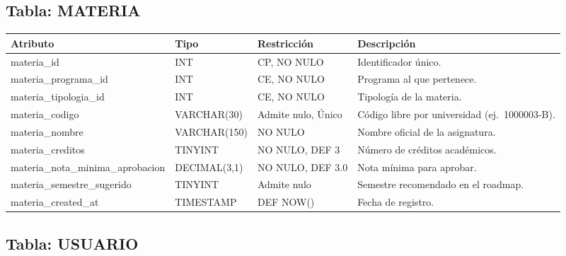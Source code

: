 \documentclass[12pt, letterpaper, twoside]{article}
\begin{document}
\subsection{Tabla: MATERIA}

\begin{center}
\begin{tabular}{p{4.2cm} p{2.8cm} p{2.8cm} p{3.8cm}}
\toprule
\textbf{Atributo} & \textbf{Tipo} & \textbf{Restricción} & \textbf{Descripción} \\
\midrule
materia\_id                       & INT          & CP, NO NULO          & Identificador único. \\
materia\_programa\_id             & INT          & CE, NO NULO          & Programa al que pertenece. \\
materia\_tipologia\_id            & INT          & CE, NO NULO          & Tipología de la materia. \\
materia\_codigo                   & VARCHAR(30)  & Admite nulo, Único   & Código libre por universidad (ej.\ 1000003-B). \\
materia\_nombre                   & VARCHAR(150) & NO NULO              & Nombre oficial de la asignatura. \\
materia\_creditos                 & TINYINT      & NO NULO, DEF 3       & Número de créditos académicos. \\
materia\_nota\_minima\_aprobacion & DECIMAL(3,1) & NO NULO, DEF 3.0     & Nota mínima para aprobar. \\
materia\_semestre\_sugerido       & TINYINT      & Admite nulo          & Semestre recomendado en el roadmap. \\
materia\_created\_at              & TIMESTAMP    & DEF NOW()            & Fecha de registro. \\
\bottomrule
\end{tabular}
\end{center}

\subsection{Tabla: USUARIO}
\end{document}
